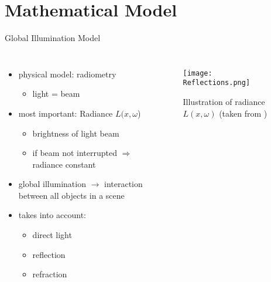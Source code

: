 \section{Mathematical Model}
\begin{frame}{Global Illumination Model}

\begin{columns}
\begin{itemize}
\item<1-> physical model: radiometry 
\begin{itemize}
\item<1-> light = beam 
\end{itemize}
\item<2-> most important: Radiance $L(x, \omega$)
\begin{itemize}
    \item<2-> brightness of light beam
    \item<2-> if beam not interrupted $\Rightarrow$ radiance constant
\end{itemize}
\item<3-> global illumination $\rightarrow$ interaction between all objects in a scene 
\item<4-> takes into account:
\begin{itemize}
    \item<4-> direct light
    \item<4-> reflection
    \item<4-> refraction
\end{itemize}
\end{itemize}
\begin{figure}
\texttt{[image: Reflections.png]}
\caption{Illustration of radiance $L(x,\omega)$ (taken from \cite{Pharr.2023})}
\end{figure}
\end{columns}

\end{frame}

